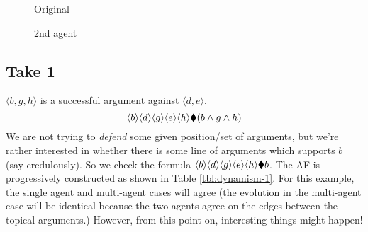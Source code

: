 \documentclass{llncs}
\begin{document}
\begin{figure}[ht]
  \centering
  \begin{minipage}[b]{0.45\linewidth}
    \scalebox{0.9} {
      
    }
    \caption{Original}
    \label{fig:full-AF}
  \end{minipage}
  \begin{minipage}[b]{0.45\linewidth}
    \scalebox{0.9} {
      
    }
    \caption{2nd agent}
    \label{fig:full-AF2}
  \end{minipage}
\end{figure}

\subsection{Take 1}
$\langle b, g, h \rangle$ is a successful argument against $\langle d, e \rangle$. 
$$\langle{b}\rangle \langle{d}\rangle \langle{g}\rangle \langle{e}\rangle \langle{h}\rangle \blacklozenge (b \wedge g \wedge h)$$
We are not trying to \emph{defend} some given position/set of arguments, but we're rather interested in whether there is some line of arguments which supports $b$ (say credulously). So we check the formula $\langle{b}\rangle \langle{d}\rangle \langle{g}\rangle \langle{e}\rangle \langle{h}\rangle \blacklozenge b$. The AF is progressively constructed as shown in Table \ref{tbl:dynamism-1}. For this example, the single agent and multi-agent cases will agree (the evolution in the multi-agent case will be identical because the two agents agree on the edges between the topical arguments.) However, from this point on, interesting things might happen! 
\end{document}
